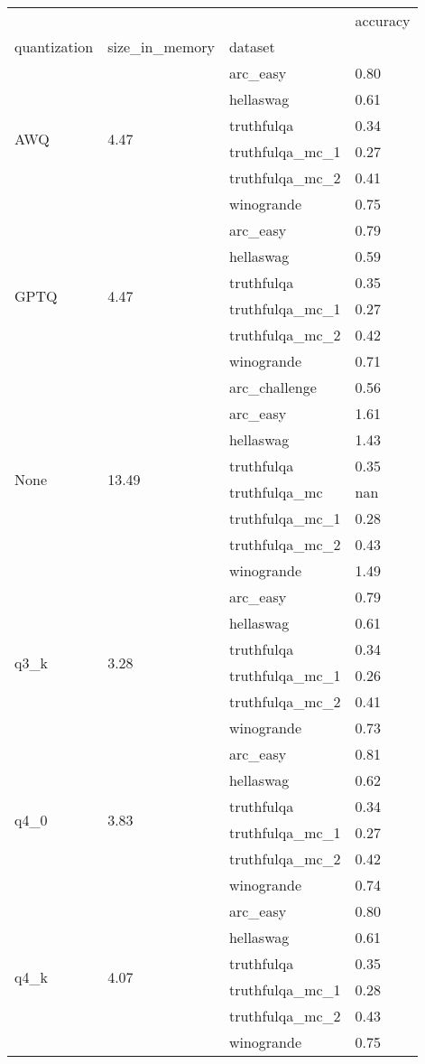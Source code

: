 \begin{tabular}{llll}
\toprule
 &  &  & accuracy \\
quantization & size\_in\_memory & dataset &  \\
\midrule
\multirow[t]{6}{*}{AWQ} & \multirow[t]{6}{*}{4.47} & arc\_easy & 0.80 \\
 &  & hellaswag & 0.61 \\
 &  & truthfulqa & 0.34 \\
 &  & truthfulqa\_mc\_1 & 0.27 \\
 &  & truthfulqa\_mc\_2 & 0.41 \\
 &  & winogrande & 0.75 \\
\cline{1-4} \cline{2-4}
\multirow[t]{6}{*}{GPTQ} & \multirow[t]{6}{*}{4.47} & arc\_easy & 0.79 \\
 &  & hellaswag & 0.59 \\
 &  & truthfulqa & 0.35 \\
 &  & truthfulqa\_mc\_1 & 0.27 \\
 &  & truthfulqa\_mc\_2 & 0.42 \\
 &  & winogrande & 0.71 \\
\cline{1-4} \cline{2-4}
\multirow[t]{8}{*}{None} & \multirow[t]{8}{*}{13.49} & arc\_challenge & 0.56 \\
 &  & arc\_easy & 1.61 \\
 &  & hellaswag & 1.43 \\
 &  & truthfulqa & 0.35 \\
 &  & truthfulqa\_mc & nan \\
 &  & truthfulqa\_mc\_1 & 0.28 \\
 &  & truthfulqa\_mc\_2 & 0.43 \\
 &  & winogrande & 1.49 \\
\cline{1-4} \cline{2-4}
\multirow[t]{6}{*}{q3\_k} & \multirow[t]{6}{*}{3.28} & arc\_easy & 0.79 \\
 &  & hellaswag & 0.61 \\
 &  & truthfulqa & 0.34 \\
 &  & truthfulqa\_mc\_1 & 0.26 \\
 &  & truthfulqa\_mc\_2 & 0.41 \\
 &  & winogrande & 0.73 \\
\cline{1-4} \cline{2-4}
\multirow[t]{6}{*}{q4\_0} & \multirow[t]{6}{*}{3.83} & arc\_easy & 0.81 \\
 &  & hellaswag & 0.62 \\
 &  & truthfulqa & 0.34 \\
 &  & truthfulqa\_mc\_1 & 0.27 \\
 &  & truthfulqa\_mc\_2 & 0.42 \\
 &  & winogrande & 0.74 \\
\cline{1-4} \cline{2-4}
\multirow[t]{6}{*}{q4\_k} & \multirow[t]{6}{*}{4.07} & arc\_easy & 0.80 \\
 &  & hellaswag & 0.61 \\
 &  & truthfulqa & 0.35 \\
 &  & truthfulqa\_mc\_1 & 0.28 \\
 &  & truthfulqa\_mc\_2 & 0.43 \\
 &  & winogrande & 0.75 \\
\cline{1-4} \cline{2-4}
\bottomrule
\end{tabular}
